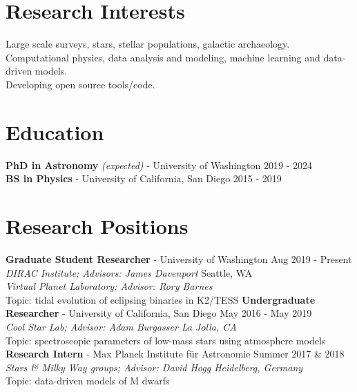 \documentclass[margin,line]{resume}
\begin{document}
\begin{resume}

\section{\mysidestyle \textcolor{bcolor}{Research Interests}}
Large scale surveys, stars, stellar populations, galactic archaeology. \\
Computational physics, data analysis and modeling, machine learning and data-driven models. \\
Developing open source tools/code.
 
       
\section{\mysidestyle \textcolor{bcolor}{Education}}
\textbf{PhD in Astronomy} \textit{(expected)} - University of Washington  \hfill 2019 - 2024 \\
\textbf{BS in Physics} - University of California, San Diego \hfill 2015 - 2019 


\section{\mysidestyle \textcolor{bcolor}{Research Positions}}

\textbf{Graduate Student Researcher} - University of Washington \hfill Aug 2019 - Present \\
\-\hspace{.25cm} \textit{DIRAC Institute; Advisors: James Davenport} \hfill Seattle, WA \\
\-\hspace{.25cm} \textit{Virtual Planet Laboratory; Advisor: Rory Barnes} \\
\-\hspace{.25cm} Topic: tidal evolution of eclipsing binaries in K2/TESS
\vspace{.2cm} \newline
\textbf{Undergraduate Researcher} - University of California, San Diego \hfill May 2016 - May 2019  \\
\-\hspace{.25cm} \textit{Cool Star Lab; Advisor: Adam Burgasser \hfill La Jolla, CA} \\ 
\-\hspace{.25cm} Topic: spectroscopic parameters of low-mass stars using atmosphere models 
\vspace{.2cm} \newline
\textbf{Research Intern} - Max Planck Institute f{\"u}r Astronomie \hfill Summer 2017 \& 2018 \\
\-\hspace{.25cm} \textit{Stars \& Milky Way groups; Advisor: David Hogg \hfill Heidelberg, Germany} \\
\-\hspace{.25cm} Topic: data-driven models of M dwarfs



\end{resume}
\end{document}
